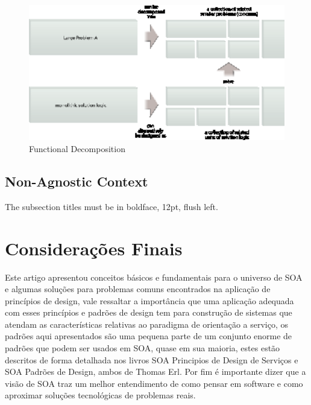 \documentclass[12pt]{article}
\begin{document}
\begin{figure}[H]
\centering
\includegraphics[width=14cm]{img/fig3.eps}
\caption{Functional Decomposition}
\label{fig:3}
\end{figure}

\subsection{Non-Agnostic Context}

The subsection titles must be in boldface, 12pt, flush left.

\section{Considerações Finais}

Este artigo apresentou conceitos básicos e fundamentais para o universo de SOA e algumas soluções para problemas comuns encontrados na aplicação de princípios de design, vale ressaltar a importância que uma aplicação adequada com esses princípios e padrões de design tem para construção de sistemas que atendam as características relativas ao paradigma de orientação a serviço, os padrões aqui apresentados são uma pequena parte de um conjunto enorme de padrões que podem ser usados em SOA, quase em sua maioria, estes estão descritos de forma detalhada nos livros SOA Principios de Design de Serviços e SOA Padrões de Design, ambos de Thomas Erl. Por fim é importante dizer que a visão de SOA traz um melhor entendimento de como pensar em software e como aproximar soluções tecnológicas de problemas reais.

\nocite{daigneau}
\nocite{gartner}
\nocite{erl_principio}
\nocite{dev1}
\nocite{dev2}
\nocite{baccaro}
\nocite{wiki}
\nocite{soa_patterns}



\end{document}
